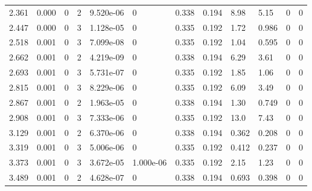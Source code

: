 \documentclass[preview]{standalone}
\begin{document}
{{\begin{tabular}{L{1.2cm}C{1.2cm} C{0.3cm}C{0.5cm} C{1.4cm}C{1.4cm} C{1.4cm}C{1.4cm} C{1.6cm}C{1.6cm} C{1.6cm}C{1.6cm}}
  2.361  &  0.000  & 0     &  2 &  9.520e-06  & 0  &  0.338&   0.194& 8.98 & 5.15   &  0 & 0  \\ 
  2.447  &  0.000  & 0     &  3 &  1.128e-05  & 0  &  0.335&   0.192& 1.72 & 0.986   &  0 & 0  \\ 
  2.518  &  0.001  & 0     &  3 &  7.099e-08  & 0  &  0.335&   0.192& 1.04 & 0.595   &  0 & 0  \\ 
  2.662  &  0.001  & 0     &  2 &  4.219e-09  & 0  &  0.338&   0.194& 6.29 & 3.61   &  0 & 0  \\ 
  2.693  &  0.001  & 0     &  3 &  5.731e-07  & 0  &  0.335&   0.192& 1.85 & 1.06   &  0 & 0  \\ 
  2.815  &  0.001  & 0     &  3 &  8.229e-06  & 0  &  0.335&   0.192& 6.09 & 3.49   &  0 & 0  \\ 
  2.867  &  0.001  & 0     &  2 &  1.963e-05  & 0  &  0.338&   0.194& 1.30 & 0.749   &  0 & 0  \\ 
  2.908  &  0.001  & 0     &  3 &  7.333e-06  & 0  &  0.335&   0.192& 13.0 & 7.43   &  0 & 0  \\ 
  3.129  &  0.001  & 0     &  2 &  6.370e-06  & 0  &  0.338&   0.194& 0.362 & 0.208   &  0 & 0  \\ 
  3.319  &  0.001  & 0     &  3 &  5.006e-06  & 0  &  0.335&   0.192& 0.412 & 0.237   &  0 & 0  \\ 
  3.373  &  0.001  & 0     &  3 &  3.672e-05  & 1.000e-06  &  0.335&   0.192& 2.15 & 1.23   &  0 & 0  \\ 
  3.489  &  0.001  & 0     &  2 &  4.628e-07  & 0  &  0.338&   0.194& 0.693 & 0.398   &  0 & 0  \\ 
\hline 
\end{tabular} 

}}
\end{document}
